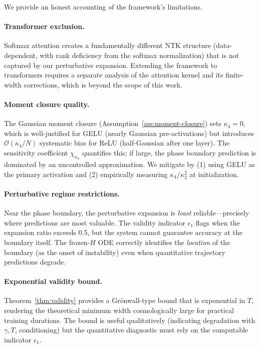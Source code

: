 \documentclass[11pt]{article}
\theoremstyle{definition}
\newcommand{\cO}{\mathcal{O}}
\begin{document}
We provide an honest accounting of the framework's limitations.

\paragraph{Transformer exclusion.} Softmax attention creates a fundamentally different NTK structure (data-dependent, with rank deficiency from the softmax normalization) that is not captured by our perturbative expansion. Extending the framework to transformers requires a separate analysis of the attention kernel and its finite-width corrections, which is beyond the scope of this work.

\paragraph{Moment closure quality.} The Gaussian moment closure (Assumption~\ref{ass:moment-closure}) sets $\kappa_4 = 0$, which is well-justified for GELU (nearly Gaussian pre-activations) but introduces $\cO(\kappa_4/N)$ systematic bias for ReLU (half-Gaussian after one layer). The sensitivity coefficient $\chi_{\kappa_4}$ quantifies this; if large, the phase boundary prediction is dominated by an uncontrolled approximation. We mitigate by (1) using GELU as the primary activation and (2) empirically measuring $\kappa_4/\kappa_2^2$ at initialization.

\paragraph{Perturbative regime restrictions.} Near the phase boundary, the perturbative expansion is \emph{least} reliable---precisely where predictions are most valuable. The validity indicator $\epsilon_1$ flags when the expansion ratio exceeds 0.5, but the system cannot guarantee accuracy at the boundary itself. The frozen-$H$ ODE correctly identifies the \emph{location} of the boundary (as the onset of instability) even when quantitative trajectory predictions degrade.

\paragraph{Exponential validity bound.} Theorem~\ref{thm:validity} provides a Gr\"onwall-type bound that is exponential in $T$, rendering the theoretical minimum width cosmologically large for practical training durations. The bound is useful qualitatively (indicating degradation with $\gamma, T$, conditioning) but the quantitative diagnostic must rely on the computable indicator $\epsilon_1$.
\end{document}

